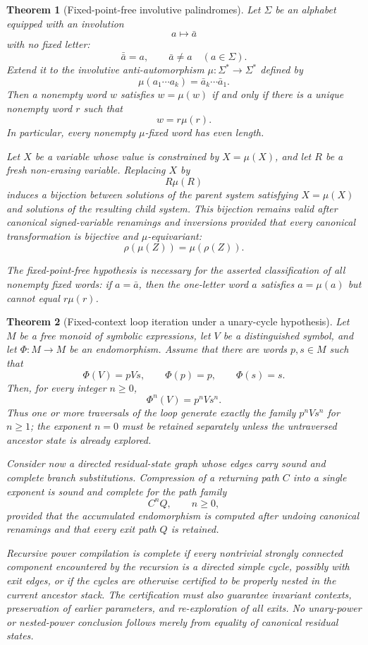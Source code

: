 \documentclass[11pt]{article}
\newtheorem{theorem}{Theorem}[section]
\begin{document}
\begin{theorem}[Fixed-point-free involutive palindromes]\label{thm:palindrome}
Let $\Sigma$ be an alphabet equipped with an involution
\[
  a\longmapsto \bar a
\]
with no fixed letter:
\[
  \bar{\bar a}=a,
  \qquad \bar a\ne a
  \quad(a\in\Sigma).
\]
Extend it to the involutive anti-automorphism $\mu:\Sigma^*\to\Sigma^*$ defined by
\[
  \mu(a_1\cdots a_k)=\bar a_k\cdots\bar a_1.
\]
Then a nonempty word $w$ satisfies $w=\mu(w)$ if and only if there is a unique nonempty word $r$ such that
\[
  w=r\mu(r).
\]
In particular, every nonempty $\mu$-fixed word has even length.

Let $X$ be a variable whose value is constrained by $X=\mu(X)$, and let $R$ be a fresh non-erasing variable. Replacing $X$ by
\[
  R\mu(R)
\]
induces a bijection between solutions of the parent system satisfying $X=\mu(X)$ and solutions of the resulting child system. This bijection remains valid after canonical signed-variable renamings and inversions provided that every canonical transformation is bijective and $\mu$-equivariant:
\[
  \rho(\mu(Z))=\mu(\rho(Z)).
\]

The fixed-point-free hypothesis is necessary for the asserted classification of all nonempty fixed words: if $a=\bar a$, then the one-letter word $a$ satisfies $a=\mu(a)$ but cannot equal $r\mu(r)$.
\end{theorem}

\begin{theorem}[Fixed-context loop iteration under a unary-cycle hypothesis]\label{thm:loops}
Let $M$ be a free monoid of symbolic expressions, let $V$ be a distinguished symbol, and let $\Phi:M\to M$ be an endomorphism. Assume that there are words $p,s\in M$ such that
\[
  \Phi(V)=pVs,
  \qquad \Phi(p)=p,
  \qquad \Phi(s)=s.
\]
Then, for every integer $n\ge 0$,
\[
  \Phi^n(V)=p^nVs^n.
\]
Thus one or more traversals of the loop generate exactly the family $p^nVs^n$ for $n\ge1$; the exponent $n=0$ must be retained separately unless the untraversed ancestor state is already explored.

Consider now a directed residual-state graph whose edges carry sound and complete branch substitutions. Compression of a returning path $C$ into a single exponent is sound and complete for the path family
\[
  C^nQ,\qquad n\ge0,
\]
provided that the accumulated endomorphism is computed after undoing canonical renamings and that every exit path $Q$ is retained.

Recursive power compilation is complete if every nontrivial strongly connected component encountered by the recursion is a directed simple cycle, possibly with exit edges, or if the cycles are otherwise certified to be properly nested in the current ancestor stack. The certification must also guarantee invariant contexts, preservation of earlier parameters, and re-exploration of all exits. No unary-power or nested-power conclusion follows merely from equality of canonical residual states.
\end{theorem}
\end{document}
